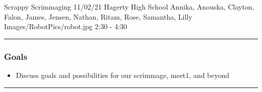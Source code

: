 \insertmeeting 
	{Scrappy Scrimmaging} 
	{11/02/21}
	{Hagerty High School}
	{Annika, Anouska, Clayton, Falon, James, Jensen, Nathan, Ritam, Rose, Samantha, Lilly}
	{Images/RobotPics/robot.jpg}
	{2:30 - 4:30}
	
\noindent\hfil\rule{\textwidth}{.4pt}\hfil
\subsubsection*{Goals}
\begin{itemize}
    \item Discuss goals and possibilities for our scrimmage, meet1, and beyond  

\end{itemize} 

\noindent\hfil\rule{\textwidth}{.4pt}\hfil

